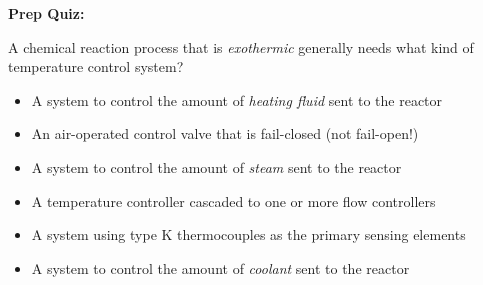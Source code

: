 












\vfil \eject

\noindent
{\bf Prep Quiz:}

A chemical reaction process that is {\it exothermic} generally needs what kind of temperature control system?

\begin{itemize}
\item{} A system to control the amount of {\it heating fluid} sent to the reactor
\vskip 5pt 
\item{} An air-operated control valve that is fail-closed (not fail-open!)
\vskip 5pt 
\item{} A system to control the amount of {\it steam} sent to the reactor
\vskip 5pt 
\item{} A temperature controller cascaded to one or more flow controllers
\vskip 5pt 
\item{} A system using type K thermocouples as the primary sensing elements
\vskip 5pt 
\item{} A system to control the amount of {\it coolant} sent to the reactor
\end{itemize}




